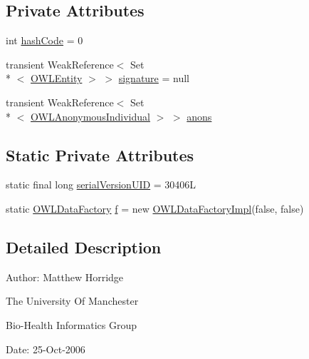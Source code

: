 \subsection*{Private Attributes}
\begin{DoxyCompactItemize}
\item 
int \hyperlink{classuk_1_1ac_1_1manchester_1_1cs_1_1owl_1_1owlapi_1_1_o_w_l_object_impl_a28af3238d92fce534d407e1eecc78aa2}{hash\-Code} = 0
\item 
transient Weak\-Reference$<$ Set\\*
$<$ \hyperlink{interfaceorg_1_1semanticweb_1_1owlapi_1_1model_1_1_o_w_l_entity}{O\-W\-L\-Entity} $>$ $>$ \hyperlink{classuk_1_1ac_1_1manchester_1_1cs_1_1owl_1_1owlapi_1_1_o_w_l_object_impl_a80d2b1d9872ff1d62f9f15e017b88331}{signature} = null
\item 
transient Weak\-Reference$<$ Set\\*
$<$ \hyperlink{interfaceorg_1_1semanticweb_1_1owlapi_1_1model_1_1_o_w_l_anonymous_individual}{O\-W\-L\-Anonymous\-Individual} $>$ $>$ \hyperlink{classuk_1_1ac_1_1manchester_1_1cs_1_1owl_1_1owlapi_1_1_o_w_l_object_impl_a88159c04b2e3b7230ceb08fbfb77a141}{anons}
\end{DoxyCompactItemize}
\subsection*{Static Private Attributes}
\begin{DoxyCompactItemize}
\item 
static final long \hyperlink{classuk_1_1ac_1_1manchester_1_1cs_1_1owl_1_1owlapi_1_1_o_w_l_object_impl_a72b26db845c44c7e0b1f46f573a62a76}{serial\-Version\-U\-I\-D} = 30406\-L
\item 
static \hyperlink{interfaceorg_1_1semanticweb_1_1owlapi_1_1model_1_1_o_w_l_data_factory}{O\-W\-L\-Data\-Factory} \hyperlink{classuk_1_1ac_1_1manchester_1_1cs_1_1owl_1_1owlapi_1_1_o_w_l_object_impl_a6e23c7ab012f3f403b7b3ed3e9bead5b}{f} = new \hyperlink{classuk_1_1ac_1_1manchester_1_1cs_1_1owl_1_1owlapi_1_1_o_w_l_data_factory_impl}{O\-W\-L\-Data\-Factory\-Impl}(false, false)
\end{DoxyCompactItemize}


\subsection{Detailed Description}
Author\-: Matthew Horridge\par
 The University Of Manchester\par
 Bio-\/\-Health Informatics Group\par
 Date\-: 25-\/\-Oct-\/2006\par
 \par
 

